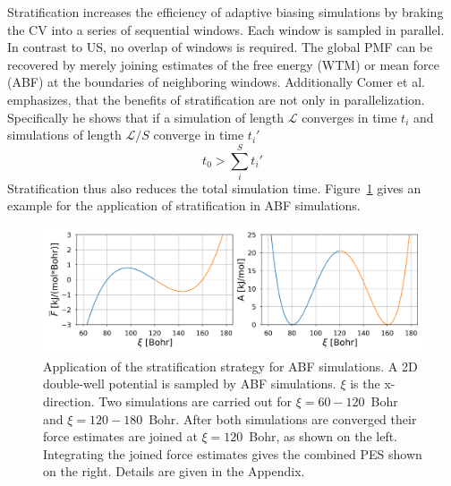 Stratification increases the efficiency of adaptive biasing simulations by braking the CV into a series of sequential windows.\autocite{valleau1972monte} Each window is sampled in parallel.
In contrast to US, no overlap of windows is required.
The global PMF can be recovered by merely joining estimates of the free energy (WTM) or mean force (ABF) at the boundaries of neighboring windows.
Additionally Comer et al.\autocite{comer2015adaptive} emphasizes, that the benefits of stratification are not only in parallelization.
Specifically he shows that if a simulation of length $\mathcal{L}$ converges in time $t_i$ and simulations of length $\mathcal{L}/S$ converge in time $t_i'$
\begin{equation}
  t_0 > \sum^S_i t_i'
\end{equation}
Stratification thus also reduces the total simulation time. Figure~\ref{fig:stratification} gives an example for the application of stratification in ABF simulations.
\begin{figure}[H]
    \centering
    \includegraphics[width=1\textwidth]{bilder/ABF_stratification}
    \caption{Application of the stratification strategy for ABF simulations. A 2D double-well potential is sampled by ABF simulations. $\xi$ is the x-direction. Two simulations are carried out for $\xi=60-120$~Bohr and $\xi=120-180$~Bohr. After both simulations are converged their force estimates are joined at $\xi=120$~Bohr, as shown on the left.
    Integrating the joined force estimates gives the combined PES shown on the right.
    Details are given in the Appendix.  }
\label{fig:stratification}%
\end{figure}

